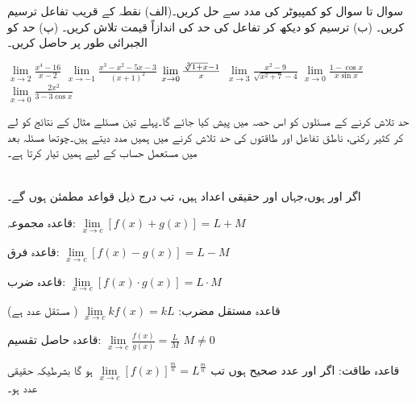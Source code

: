 سوال  تا سوال  کو کمپیوٹر کی مدد سے حل کریں۔(الف) نقطہ  کے قریب تفاعل ترسیم کریں۔ (ب) ترسیم کو دیکھ کر تفاعل کی حد کی اندازاً قیمت تلاش کریں۔ (پ) حد کو الجبرائی طور پر حاصل کریں۔

$\lim\limits_{x\to 2} \tfrac{x^4-16}{x-2}$
$\lim\limits_{x\to -1} \tfrac{x^3-x^2-5x-3}{(x+1)^2}$
$\lim\limits_{x\to 0} \tfrac{\sqrt[\leftroot{-2}3]{1+x}-1}{x}$
$\lim\limits_{x\to 3} \tfrac{x^2-9}{\sqrt{x^2+7}-4}$
$\lim\limits_{x\to 0} \tfrac{1-\cos x}{x\sin x}$
$\lim\limits_{x\to 0} \tfrac{2x^2}{3-3\cos x}$



حد تلاش کرنے کے مسئلوں کو اس حصہ میں پیش کیا جائے گا۔پہلے تین مسئلے مثال  کے نتائج کو لے کر کثیر رکنی، ناطق تفاعل اور طاقتوں  کی حد تلاش کرنے میں ہمیں مدد دیتے ہیں۔چوتھا مسئلہ بعد میں مستعمل  حساب کے لیے ہمیں تیار کرتا ہے۔


\\
اگر  اور  ہوں،جہاں  اور  حقیقی اعداد ہیں،  تب درج ذیل قواعد مطمئن ہوں گے۔
\begin{description}
\item{قاعدہ مجموعہ:}\quad 
$\lim\limits_{x\to c}[f(x)+g(x)]=L+M$
\item{قاعدہ فرق:}\quad
$\lim\limits_{x\to c}[f(x)-g(x)]=L-M$
\item{قاعدہ ضرب:}\quad
$\lim\limits_{x\to c}[f(x)\cdot g(x)]=L\cdot M$
\item{قاعدہ مستقل مضرب:}\quad
$\lim\limits_{x\to c} k f(x)=kL$
\quad
( مستقل عدد ہے)
\item{قاعدہ حاصل تقسیم:}\quad
$\lim\limits_{x\to c}\tfrac{f(x)}{g(x)}=\tfrac{L}{M}$
\quad
$M\ne 0$
\item{قاعدہ طاقت:}\quad
اگر  اور  عدد صحیح ہوں تب
$\lim\limits_{x\to c}[f(x)]^{\tfrac{m}{n}}=L^{\tfrac{m}{n}}$
 ہو گا بشرطیکہ   حقیقی عدد ہو۔
\end{description}

